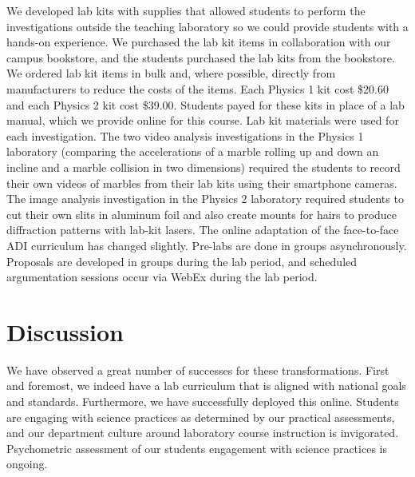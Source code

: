 \documentclass[aip, numerical, preprint]{revtex4-2}
\begin{document}
We developed lab kits with supplies that allowed students to perform the investigations outside
the teaching laboratory so we could provide students with a hands-on experience. We purchased
the lab kit items in collaboration with our campus bookstore, and the students purchased the
lab kits from the bookstore. We ordered lab kit items in bulk and, where possible, directly from
manufacturers to reduce the costs of the items. Each Physics 1 kit cost \$20.60 and each
Physics 2 kit cost \$39.00. Students payed for these kits in place of a lab manual, which we
provide online for this course. Lab kit materials were used for each investigation. The two video 
analysis investigations in the Physics 1 laboratory (comparing the accelerations of a marble 
rolling up and down an incline and a marble collision in two dimensions) required the students to 
record their own videos of marbles from their lab kits using their smartphone cameras. The image 
analysis investigation in the 
Physics 2 laboratory required students to cut their own slits in aluminum foil and also create mounts 
for hairs to produce diffraction patterns with lab-kit lasers. The online adaptation of the face-to-face 
ADI curriculum has changed slightly. Pre-labs are done in groups asynchronously.  Proposals are 
developed in groups during the lab period, and scheduled argumentation sessions occur via 
WebEx during the lab period.

\section{Discussion}
We have observed a great number of successes for these transformations.  First and foremost, we
indeed have a lab curriculum that is aligned with national goals and standards. Furthermore, we
have successfully deployed this online.  Students are engaging with science practices as
determined by our practical assessments, and our department culture around laboratory course
instruction is invigorated. Psychometric assessment of our students engagement with science
practices is ongoing.
\end{document}
